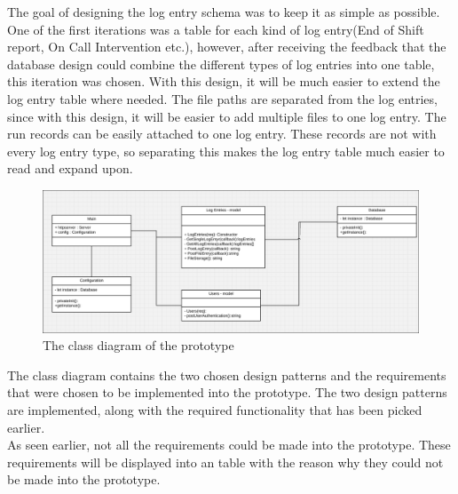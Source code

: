 \documentclass[paper=a4, fontsize=11pt,twoside]{scrartcl}	%
\begin{document}
\noindent
The goal of designing the log entry schema was to keep it as simple as possible. One of the first iterations was a table for each kind of log entry(End of Shift report, On Call Intervention etc.), however, after receiving the feedback that the database design could combine the different types of log entries into one table, this iteration was chosen. With this design, it will be much easier to extend the log entry table where needed. The file paths are separated from the log entries, since with this design, it will be easier to add multiple files to one log entry. The run records can be easily attached to one log entry. These records are not with every log entry type, so separating this makes the log entry table much easier to read and expand upon. 

\begin{figure}[H]
\includegraphics[scale=0.35]{class_diagram}
\caption{The class diagram of the prototype}
\end{figure}
\noindent
The class diagram contains the two chosen design patterns and the requirements that were chosen to be implemented into the prototype. The two design patterns are implemented, along with the required functionality that has been picked earlier.\\
As seen earlier, not all the requirements could be made into the prototype. These requirements will be displayed into an table with the reason why they could not be made into the prototype.
\end{document}
